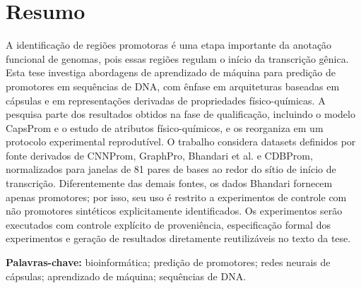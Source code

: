 \chapter*{Resumo}

A identificação de regiões promotoras é uma etapa importante da anotação
funcional de genomas, pois essas regiões regulam o início da transcrição gênica.
Esta tese investiga abordagens de aprendizado de máquina para predição de
promotores em sequências de DNA, com ênfase em arquiteturas baseadas em cápsulas
e em representações derivadas de propriedades físico-químicas. A pesquisa parte
dos resultados obtidos na fase de qualificação, incluindo o modelo CapsProm e o
estudo de atributos físico-químicos, e os reorganiza em um protocolo
experimental reprodutível. O trabalho considera datasets definidos por fonte derivados
de CNNProm, GraphPro, Bhandari et al. e CDBProm, normalizados para janelas de 81
pares de bases ao redor do sítio de início de transcrição. Diferentemente das
demais fontes, os dados Bhandari fornecem apenas promotores; por isso, seu uso é
restrito a experimentos de controle com não promotores sintéticos explicitamente
identificados. Os experimentos serão
executados com controle explícito de proveniência, especificação formal dos
experimentos e geração de resultados diretamente reutilizáveis no texto da
tese.

\noindent \textbf{Palavras-chave:} bioinformática; predição de promotores;
redes neurais de cápsulas; aprendizado de máquina; sequências de DNA.
